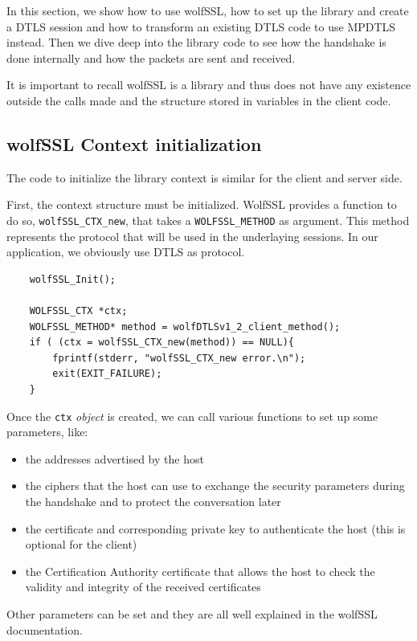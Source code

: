In this section, we show how to use wolfSSL, how to set up the library and create a DTLS session and how to transform an existing DTLS code to use MPDTLS instead. Then we dive deep into the library code to see how the handshake is done internally and how the packets are sent and received.

It is important to recall wolfSSL is a library and thus does not have any existence outside the calls made and the structure stored in variables in the client code.

\subsection{wolfSSL Context initialization}

The code to initialize the library context is similar for the client and server side.

First, the context structure must be initialized. WolfSSL provides a function to do so, \texttt{wolfSSL\_CTX\_new}, that takes a \texttt{WOLFSSL\_METHOD} as argument. This method represents the protocol that will be used in the underlaying sessions. In our application, we obviously use DTLS as protocol.

\begin{lstlisting}
    wolfSSL_Init();

    WOLFSSL_CTX *ctx;
    WOLFSSL_METHOD* method = wolfDTLSv1_2_client_method();
    if ( (ctx = wolfSSL_CTX_new(method)) == NULL){
        fprintf(stderr, "wolfSSL_CTX_new error.\n");
        exit(EXIT_FAILURE);
    }
\end{lstlisting}

Once the \texttt{ctx} \textit{object} is created, we can call various functions to set up some parameters, like:
\begin{itemize}
\item the addresses advertised by the host
\item the ciphers that the host can use to exchange the security parameters during the handshake and to protect the conversation later
\item the certificate and corresponding private key to authenticate the host (this is optional for the client)
\item the Certification Authority certificate that allows the host to check the validity and integrity of the received certificates
\end{itemize}

Other parameters can be set and they are all well explained in the wolfSSL documentation\cite{wolfssl.doc}.

